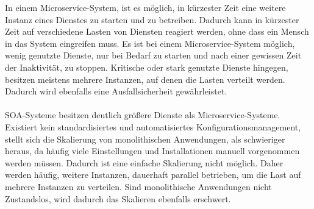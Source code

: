 In einem Microservice-System, ist es möglich, in kürzester Zeit eine weitere Instanz eines Dienstes zu starten und zu betreiben. Dadurch kann in kürzester Zeit auf verschiedene Lasten von Diensten reagiert werden, ohne dass ein Mensch in das System eingreifen muss. Es ist bei einem Microservice-System möglich, wenig genutzte Dienste, nur bei Bedarf zu starten und nach einer gewissen Zeit der Inaktivität, zu stoppen. Kritische oder stark genutzte Dienste hingegen, besitzen meistens mehrere Instanzen, auf denen die Lasten verteilt werden. Dadurch wird ebenfalls eine Ausfallsicherheit gewährleistet.
\\\\
SOA-Systeme besitzen deutlich größere Dienste als Microservice-Systeme. Existiert kein standardisiertes und automatisiertes Konfigurationsmanagement, stellt sich die Skalierung von monolithischen Anwendungen, als schwieriger heraus, da häufig viele Einstellungen und Installationen manuell vorgenommen werden müssen. Dadurch ist eine einfache Skalierung nicht möglich. Daher werden häufig, weitere Instanzen, dauerhaft parallel betrieben, um die Last auf mehrere Instanzen zu verteilen. Sind monolithische Anwendungen nicht Zustandslos, wird dadurch das Skalieren ebenfalls erschwert.

